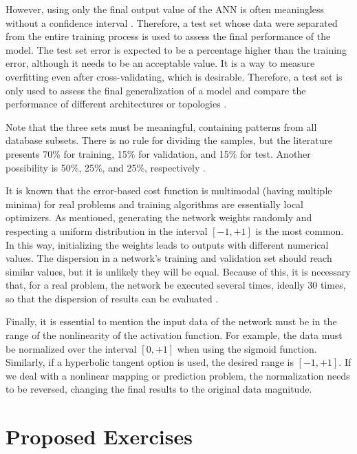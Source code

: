 However, using only the final output value of the ANN is often meaningless without a confidence interval \cite{Kohavi1995}. Therefore, a test set whose data were separated from the entire training process is used to assess the final performance of the model. The test set error is expected to be a percentage higher than the training error, although it needs to be an acceptable value. It is a way to measure overfitting even after cross-validating, which is desirable. Therefore, a test set is only used to assess the final generalization of a model and compare the performance of different architectures or topologies \cite{Ripley2005}.

Note that the three sets must be meaningful, containing patterns from all database subsets. There is no rule for dividing the samples, but the literature presents 70\% for training, 15\% for validation, and 15\% for test. Another possibility is 50\%, 25\%, and 25\%, respectively \cite{haykin}.

It is known that the error-based cost function is multimodal (having multiple minima) for real problems and training algorithms are essentially local optimizers. As mentioned, generating the network weights randomly and respecting a uniform distribution in the interval $[-1,+1]$ is the most common. In this way, initializing the weights leads to outputs with different numerical values. The dispersion in a network's training and validation set should reach similar values, but it is unlikely they will be equal. Because of this, it is necessary that, for a real problem, the network %
be executed several times, ideally 30 times, so that the dispersion of results can be evaluated \cite{demvsar2006statistical}. 

Finally, it is essential to mention the input data of the network must be in the range of the nonlinearity of the activation function. For example, the data must be normalized over the interval $[0,+1]$ when using the sigmoid function. 
Similarly, if a hyperbolic tangent option is used, the desired range is $[-1,+1]$. If %
we deal with a nonlinear mapping or prediction problem, the normalization needs to be reversed, changing the final results to the original data magnitude.

\section{Proposed Exercises}
\label{ssec:treino}

